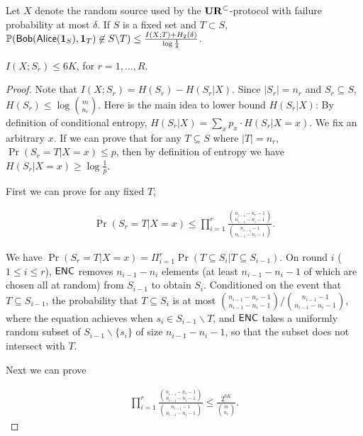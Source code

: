 \begin{corollary}\label{corollary:sampler-failure}
  Let $X$ denote the random source used by the $\mathbf{UR}^\subset$-protocol with failure probability at most $\delta$. If $S$ is a fixed set and $T\subset S$, $\operatorname*{\mathbb{P}}(\mathsf{Bob}(\mathsf{Alice}(\mathbf{1}_S), \mathbf{1}_T)\not\in S\backslash T)\le \frac{I(X;T)+H_2(\delta)}{\log\frac{1}{\delta}}$.
\end{corollary}

\begin{lemma}\label{lemma:mutual-entropy-bound}
  $I(X;S_r)\le 6K$, for $r=1,\ldots, R$.
\end{lemma}

\begin{proof}
  Note that $I(X;S_r)=H(S_r)-H(S_r|X)$. Since $|S_r|=n_r$ and $S_r\subseteq S$, $H(S_r)\le \log {m \choose n_r}$. Here is the main idea to lower bound $H(S_r|X)$: By definition of conditional entropy, $H(S_r|X)=\sum_x{p_x\cdot H(S_r|X=x)}$. We fix an arbitrary $x$. If we can prove that for any $T\subseteq S$ where $|T|=n_r$, $\Pr(S_r=T|X=x)\le p$, then by definition of entropy we have $H(S_r|X=x)\ge\log\frac{1}{p}$. 
  
  First we can prove for any fixed $T$,
  
  \begin{align}
    \Pr(S_r=T|X=x)\le \prod_{i=1}^{r}{\frac{{n_{i-1}-n_r-1 \choose n_{i-1}-n_i-1}}{{n_{i-1}-1 \choose n_{i-1}-n_i-1}}}.
  \end{align}
  
  We have $\Pr(S_r=T|X=x)=\Pi_{i=1}^{r}{\Pr(T\subseteq S_i|T\subseteq S_{i-1})}$. 
  On round $i$ ($1\le i \le r$), $\textsf{ENC}$ removes $n_{i-1}-n_i$ elements (at least $n_{i-1}-n_i-1$ of which are chosen all at random) from $S_{i-1}$ to obtain $S_i$. 
  Conditioned on the event that $T\subseteq S_{i-1}$, the probability that $T\subseteq S_i$ is at most ${{n_{i-1}-n_r-1 \choose n_{i-1}-n_i-1}}/{{n_{i-1}-1 \choose n_{i-1}-n_i-1}}$, where the equation achieves when $s_i\in S_{i-1}\backslash T$, and $\textsf{ENC}$ takes a uniformly random subset of $S_{i-1}\backslash \{s_i\}$ of size $n_{i-1}-n_i-1$, so that the subset does not intersect with $T$.
  
  Next we can prove 
  
  \begin{align}
    \prod_{i=1}^{r}{\frac{{n_{i-1}-n_r-1 \choose n_{i-1}-n_i-1}}{{n_{i-1}-1 \choose n_{i-1}-n_i-1}}} \le \frac{2^{6K}}{{m \choose n_r}}. \label{eqn:prod-bound}
  \end{align}
    

\end{proof}
